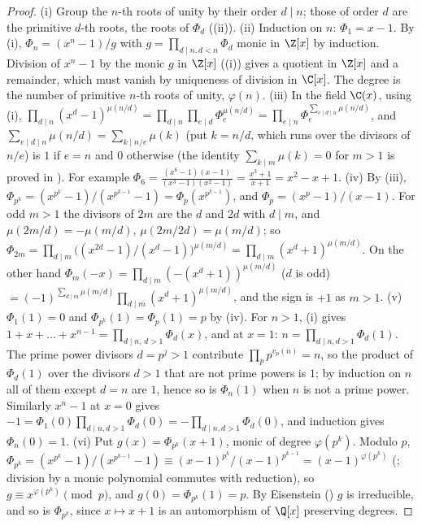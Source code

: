 \begin{proof}
(i) Group the $n$-th roots of unity by their order $d\mid n$; those of order $d$ are the primitive $d$-th roots, the roots of $\Phi_d$
((ii)).
(ii) Induction on $n$: $\Phi_1=x-1$. By (i), $\Phi_n=(x^n-1)/g$ with $g=\prod_{d\mid n,d<n}\Phi_d$ monic in $\Z[x]$ by induction. Division of $x^n-1$ by the
monic $g$ in $\Z[x]$ ((i)) gives a quotient in $\Z[x]$ and a remainder, which must vanish by uniqueness of
division in $\C[x]$. The degree is the number of primitive $n$-th roots of unity, $\varphi(n)$.
(iii) In the field $\C(x)$, using (i),
$\prod_{d\mid n}(x^d-1)^{\mu(n/d)}=\prod_{d\mid n}\prod_{e\mid d}\Phi_e^{\mu(n/d)}=\prod_{e\mid n}\Phi_e^{\sum_{e\mid d\mid n}\mu(n/d)}$, and $\sum_{e\mid d\mid n}\mu(n/d)=\sum_{k\mid n/e}\mu(k)$ (put $k=n/d$, which
runs over the divisors of $n/e$) is $1$ if $e=n$ and $0$ otherwise (the identity $\sum_{k\mid m}\mu(k)=0$ for $m>1$ is proved in ).
For example $\Phi_6=\frac{(x^6-1)(x-1)}{(x^3-1)(x^2-1)}=\frac{x^3+1}{x+1}=x^2-x+1$.
(iv) By (iii), $\Phi_{p^k}=(x^{p^k}-1)/(x^{p^{k-1}}-1)=\Phi_p(x^{p^{k-1}})$, and $\Phi_p=(x^p-1)/(x-1)$. For odd $m>1$ the divisors of $2m$ are the $d$ and
$2d$ with $d\mid m$, and $\mu(2m/d)=-\mu(m/d)$, $\mu(2m/2d)=\mu(m/d)$; so $\Phi_{2m}=\prod_{d\mid m}\bigl((x^{2d}-1)/(x^d-1)\bigr)^{\mu(m/d)}=\prod_{d\mid m}(x^d+1)^{\mu(m/d)}$.
On the other hand $\Phi_m(-x)=\prod_{d\mid m}(-(x^d+1))^{\mu(m/d)}$ ($d$ is odd) $=(-1)^{\sum_{d\mid m}\mu(m/d)}\prod_{d\mid m}(x^d+1)^{\mu(m/d)}$, and the sign is $+1$
as $m>1$.
(v) $\Phi_1(1)=0$ and $\Phi_{p^k}(1)=\Phi_p(1)=p$ by (iv). For $n>1$, (i) gives $1+x+\dots+x^{n-1}=\prod_{d\mid n,\,d>1}\Phi_d(x)$, and at $x=1$:
$n=\prod_{d\mid n,d>1}\Phi_d(1)$. The prime power divisors $d=p^j>1$ contribute $\prod_pp^{v_p(n)}=n$, so the product of $\Phi_d(1)$ over the
divisors $d>1$ that are not prime powers is $1$; by induction on $n$ all of them except $d=n$ are $1$, hence so is $\Phi_n(1)$ when $n$ is
not a prime power. Similarly $x^n-1$ at $x=0$ gives $-1=\Phi_1(0)\prod_{d\mid n,d>1}\Phi_d(0)=-\prod_{d\mid n,d>1}\Phi_d(0)$, and induction gives $\Phi_n(0)=1$.
(vi) Put $g(x)=\Phi_{p^k}(x+1)$, monic of degree $\varphi(p^k)$. Modulo $p$, $\Phi_{p^k}=(x^{p^k}-1)/(x^{p^{k-1}}-1)\equiv(x-1)^{p^k}/(x-1)^{p^{k-1}}=(x-1)^{\varphi(p^k)}$
(; division by a monic polynomial commutes with reduction), so $g\equiv x^{\varphi(p^k)}\pmod p$, and $g(0)=\Phi_{p^k}(1)=p$. By
Eisenstein () $g$ is irreducible, and so is $\Phi_{p^k}$, since $x\mapsto x+1$ is an automorphism of $\Q[x]$ preserving degrees.
\end{proof}


